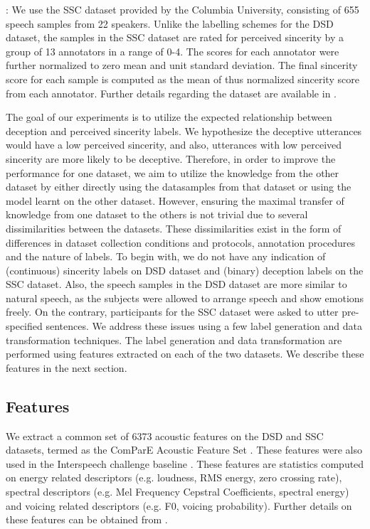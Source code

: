 \documentclass{article}
\begin{document}
\begin{spacing}{0.89}
:
We use the SSC dataset provided by the Columbia University, consisting of 655 speech samples from 22 speakers.
Unlike the labelling schemes for the DSD dataset, the samples in the SSC dataset are rated for perceived sincerity by a group of 13 annotators in a range of 0-4. 
The scores for each annotator were further normalized to zero mean and unit standard deviation.
The final sincerity score for each sample is computed as the mean of thus normalized sincerity score from each annotator.
Further details regarding the dataset are available in \cite{schuller2016interspeech}.

The goal of our experiments is to utilize the expected relationship between deception and perceived sincerity labels.
We hypothesize the deceptive utterances would have a low perceived sincerity, and also, utterances with low perceived sincerity are more likely to be deceptive.
Therefore, in order to improve the performance for one dataset, we aim to utilize the knowledge from the other dataset by either directly using the datasamples from that dataset or using the model learnt on the other dataset.
However, ensuring the maximal transfer of knowledge from one dataset to the others is not trivial due to several dissimilarities between the datasets.
These dissimilarities exist in the form of differences in dataset collection conditions and protocols, annotation procedures and the nature of labels.
To begin with, we do not have any indication of (continuous) sincerity labels on DSD dataset and (binary) deception labels on the SSC dataset.
Also, the speech samples in the DSD dataset are more similar to natural speech, as the subjects were allowed to arrange speech and show emotions freely. 
On the contrary, participants for the SSC dataset were asked to utter pre-specified sentences. 
We address these issues using a few label generation and data transformation techniques.
The label generation and data transformation are performed using features extracted on each of the two datasets.
We describe these features in the next section.

\vspace{-3mm}
\subsection{Features}
\vspace{-2mm}
\label{sec:feats} 
We extract a common set of 6373 acoustic features on the DSD and SSC datasets, termed as the ComParE Acoustic Feature Set \cite{weninger2013acoustics}. 
These features were also used in the Interspeech challenge baseline \cite{schuller2015interspeech,schuller2016interspeech}.
These features are statistics computed on energy related descriptors (e.g. loudness, RMS energy, zero crossing rate), spectral descriptors (e.g. Mel Frequency Cepstral Coefficients, spectral energy) and voicing related descriptors (e.g. F0, voicing probability).
Further details on these features can be obtained from \cite{weninger2013acoustics}. 


\end{spacing}
\end{document}
